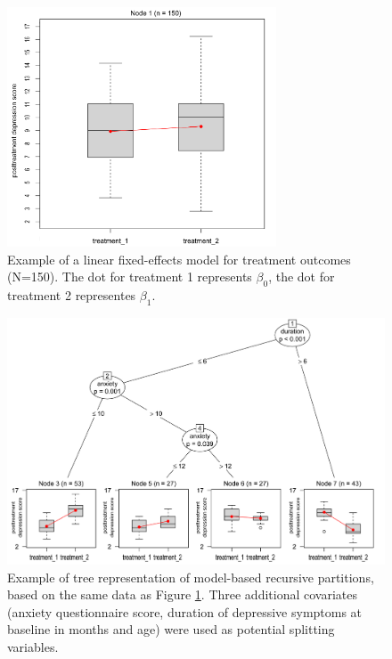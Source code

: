 \documentclass[nobf,man]{apa}
\begin{document}
\begin{figure}
    \includegraphics[width=8cm]{Interaction_ex;treedepth1.pdf}
	\caption{Example of a linear fixed-effects model for treatment outcomes (N=150). The dot for treatment 1 represents $\beta_0$, the dot for treatment 2 representes $\beta_1$.}
	\label{fig:fixed_effects}
\end{figure}

\begin{figure}
    \includegraphics[width=15cm]{Interaction_ex;treedepth3.pdf}
    \caption{Example of tree representation of model-based recursive partitions, based on the same data as Figure \ref{fig:fixed_effects}. Three additional covariates (anxiety questionnaire score, duration of depressive symptoms at baseline in months and age) were used as potential splitting variables.}
    \label{fig:example_mobtree}
\end{figure}
\end{document}
